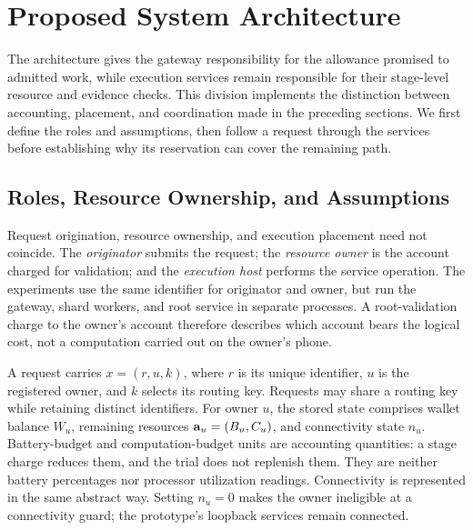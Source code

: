 \section{Proposed System Architecture}
\label{sec:architecture}

The architecture gives the gateway responsibility for the allowance promised
to admitted work, while execution services remain responsible for their
stage-level resource and evidence checks. This division implements the
distinction between accounting, placement, and coordination made in the
preceding sections. We first define the roles and assumptions, then follow
a request through the services before establishing why its reservation can
cover the remaining path.

\subsection{Roles, Resource Ownership, and Assumptions}

Request origination, resource ownership, and execution placement need not
coincide. The \emph{originator} submits the request; the \emph{resource owner}
is the account charged for validation; and the \emph{execution host} performs
the service operation. The experiments use the same identifier for originator
and owner, but run the gateway, shard workers, and root service in separate
processes. A root-validation charge to the owner's account therefore describes
which account bears the logical cost, not a computation carried out on the owner's phone.

A request carries $x=(r,u,k)$, where $r$ is its unique identifier, $u$ is
the registered owner, and $k$ selects its routing key. Requests may share a
routing key while retaining distinct identifiers. For owner $u$, the stored
state comprises wallet balance $W_u$, remaining resources $\mathbf a_u=(B_u,C_u)$,
and connectivity state $n_u$. Battery-budget and computation-budget units
are accounting quantities: a stage charge reduces them, and the trial does
not replenish them. They are neither battery percentages nor processor
utilization readings. Connectivity is represented in the same abstract way.
Setting $n_u=0$ makes the owner ineligible at a connectivity guard; the
prototype's loopback services remain connected.

